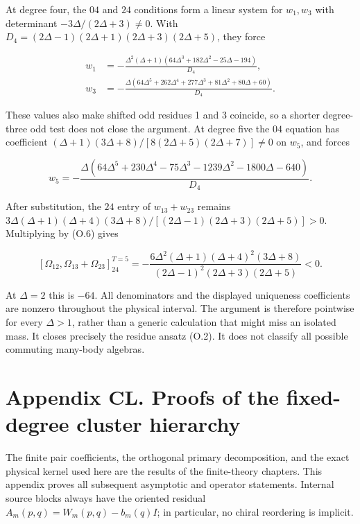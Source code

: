 \documentclass[a4paper,11pt]{article}
\numberwithin{equation}{section}
\begin{document}
At degree four, the \(04\) and \(24\) conditions form a linear system for \(w_1,w_3\) with determinant \(-3\Delta/(2\Delta+3)\ne0\). With \(D_4=(2\Delta-1)(2\Delta+1)(2\Delta+3)(2\Delta+5)\), they force

\[
\begin{aligned}
w_1&=-\frac{\Delta^2(\Delta+1)(64\Delta^3+182\Delta^2-25\Delta-194)}{D_4},\\
w_3&=-\frac{\Delta(64\Delta^5+262\Delta^4+277\Delta^3+81\Delta^2+80\Delta+60)}{D_4}.
\end{aligned}
\tag{O.7}
\]

These values also make shifted odd residues 1 and 3 coincide, so a shorter degree-three odd test does not close the argument. At degree five the \(04\) equation has coefficient \((\Delta+1)(3\Delta+8)/[8(2\Delta+5)(2\Delta+7)]\ne0\) on \(w_5\), and forces

\[
w_5=-\frac{\Delta(64\Delta^5+230\Delta^4-75\Delta^3-1239\Delta^2-1800\Delta-640)}{D_4}.
\tag{O.8}
\]

After substitution, the \(24\) entry of \(w_{13}+w_{23}\) remains \(3\Delta(\Delta+1)(\Delta+4)(3\Delta+8)/[(2\Delta-1)(2\Delta+3)(2\Delta+5)]>0\). Multiplying by (O.6) gives

\[
[\Omega_{12},\Omega_{13}+\Omega_{23}]^{T=5}_{24}
=-\frac{6\Delta^2(\Delta+1)(\Delta+4)^2(3\Delta+8)}
{(2\Delta-1)^2(2\Delta+3)(2\Delta+5)}<0.
\tag{O.9}
\]

At \(\Delta=2\) this is \(-64\). All denominators and the displayed uniqueness coefficients are nonzero throughout the physical interval. The argument is therefore pointwise for every \(\Delta>1\), rather than a generic calculation that might miss an isolated mass. It closes precisely the residue ansatz (O.2). It does not classify all possible commuting many-body algebras.

\clearpage
\hypertarget{appendix-cl.-proofs-of-the-fixed-degree-cluster-hierarchy}{%
\section{Appendix CL. Proofs of the fixed-degree cluster hierarchy}\label{appendix-cl.-proofs-of-the-fixed-degree-cluster-hierarchy}}

The finite pair coefficients, the orthogonal primary decomposition, and the exact physical kernel used here are the results of the finite-theory chapters. This appendix proves all subsequent asymptotic and operator statements. Internal source blocks always have the oriented residual \(A_m(p,q)=W_m(p,q)-b_m(q)I\); in particular, no chiral reordering is implicit.
\end{document}
